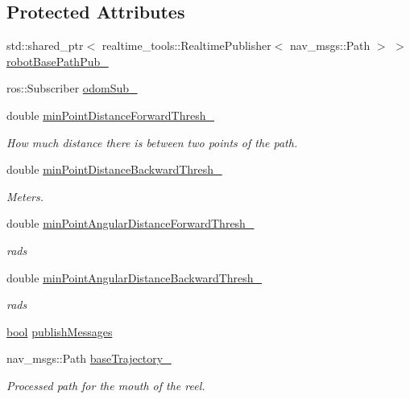 \subsection*{Protected Attributes}
\begin{DoxyCompactItemize}
\item 
std\+::shared\+\_\+ptr$<$ realtime\+\_\+tools\+::\+Realtime\+Publisher$<$ nav\+\_\+msgs\+::\+Path $>$ $>$ \hyperlink{classodom__tracker_1_1OdomTracker_a53e20a1b81ef82bf4c736d554e77a828}{robot\+Base\+Path\+Pub\+\_\+}
\item 
ros\+::\+Subscriber \hyperlink{classodom__tracker_1_1OdomTracker_a186753d1ad08b52714312a124d62029f}{odom\+Sub\+\_\+}
\item 
double \hyperlink{classodom__tracker_1_1OdomTracker_adda207eec9e5a5999e1e97e6f2876377}{min\+Point\+Distance\+Forward\+Thresh\+\_\+}
\begin{DoxyCompactList}\small\item\em How much distance there is between two points of the path. \end{DoxyCompactList}\item 
double \hyperlink{classodom__tracker_1_1OdomTracker_ae168f975b648874e7f00c2431683b3b1}{min\+Point\+Distance\+Backward\+Thresh\+\_\+}
\begin{DoxyCompactList}\small\item\em Meters. \end{DoxyCompactList}\item 
double \hyperlink{classodom__tracker_1_1OdomTracker_acd2883047a61afe3f574af0995ef7a09}{min\+Point\+Angular\+Distance\+Forward\+Thresh\+\_\+}
\begin{DoxyCompactList}\small\item\em rads \end{DoxyCompactList}\item 
double \hyperlink{classodom__tracker_1_1OdomTracker_a6b9214dccdd97870e2baf8ab51d47727}{min\+Point\+Angular\+Distance\+Backward\+Thresh\+\_\+}
\begin{DoxyCompactList}\small\item\em rads \end{DoxyCompactList}\item 
\hyperlink{classbool}{bool} \hyperlink{classodom__tracker_1_1OdomTracker_a4d617a7bc17a7880a5ebee9697f827c0}{publish\+Messages}
\item 
nav\+\_\+msgs\+::\+Path \hyperlink{classodom__tracker_1_1OdomTracker_a889adca220c33056d9a582eceda64adc}{base\+Trajectory\+\_\+}
\begin{DoxyCompactList}\small\item\em Processed path for the mouth of the reel. \end{DoxyCompactList}\item 

\end{DoxyCompactItemize}
